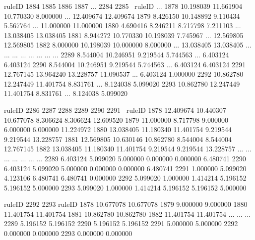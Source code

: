 ruleID       1884       1885       1886       1887  ...       2284       2285  \
ruleID                                              ...                         
1878    10.198039  11.661904  10.770330   8.000000  ...  12.409674  12.409674   
1879     8.426150  10.148892   9.110434   5.567764  ...  11.000000  11.000000   
1880     4.690416   8.246211   8.717798   7.211103  ...  13.038405  13.038405   
1881     8.944272  10.770330  10.198039   7.745967  ...  12.569805  12.569805   
1882     8.000000  10.198039  10.000000   8.000000  ...  13.038405  13.038405   
...           ...        ...        ...        ...  ...        ...        ...   
2289     8.544004  10.246951   9.219544   5.744563  ...   6.403124   6.403124   
2290     8.544004  10.246951   9.219544   5.744563  ...   6.403124   6.403124   
2291    12.767145  13.964240  13.228757  11.090537  ...   6.403124   1.000000   
2292    10.862780  12.247449  11.401754   8.831761  ...   8.124038   5.099020   
2293    10.862780  12.247449  11.401754   8.831761  ...   8.124038   5.099020   

ruleID       2286       2287       2288      2289      2290       2291  \
ruleID                                                                   
1878    12.409674  10.440307  10.677078  8.306624  8.306624  12.609520   
1879    11.000000   8.717798   9.000000  6.000000  6.000000  11.224972   
1880    13.038405  11.180340  11.401754  9.219544  9.219544  13.228757   
1881    12.569805  10.630146  10.862780  8.544004  8.544004  12.767145   
1882    13.038405  11.180340  11.401754  9.219544  9.219544  13.228757   
...           ...        ...        ...       ...       ...        ...   
2289     6.403124   5.099020   5.000000  0.000000  0.000000   6.480741   
2290     6.403124   5.099020   5.000000  0.000000  0.000000   6.480741   
2291     1.000000   5.099020   4.123106  6.480741  6.480741   0.000000   
2292     5.099020   1.000000   1.414214  5.196152  5.196152   5.000000   
2293     5.099020   1.000000   1.414214  5.196152  5.196152   5.000000   

ruleID       2292       2293  
ruleID                        
1878    10.677078  10.677078  
1879     9.000000   9.000000  
1880    11.401754  11.401754  
1881    10.862780  10.862780  
1882    11.401754  11.401754  
...           ...        ...  
2289     5.196152   5.196152  
2290     5.196152   5.196152  
2291     5.000000   5.000000  
2292     0.000000   0.000000  
2293     0.000000   0.000000  

